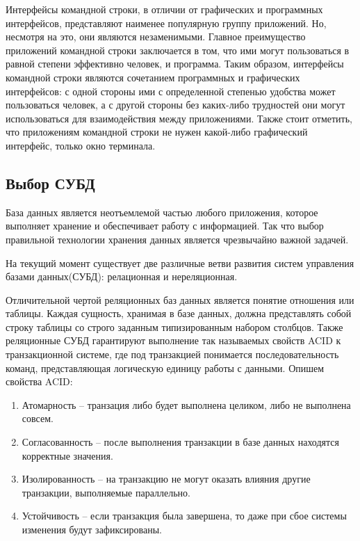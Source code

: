 Интерфейсы командной строки, в отличии от графических и программных интерфейсов, представляют
наименее популярную группу приложений. Но, несмотря на это, они являются
незаменимыми. Главное преимущество приложений командной строки заключается в том, что
ими могут пользоваться в равной степени эффективно человек, и программа. Таким образом,
интерфейсы командной строки являются сочетанием программных и графических интерфейсов:
с одной стороны ими с определенной степенью удобства может пользоваться человек, а с другой
стороны без каких-либо трудностей они могут использоваться для взаимодействия между
приложениями. Также стоит отметить, что приложениям командной строки не нужен какой-либо
графический интерфейс, только окно терминала.

\subsection*{Выбор СУБД}

База данных является неотъемлемой частью любого приложения, которое выполняет
хранение и обеспечивает работу с информацией. Так что выбор правильной технологии
хранения данных является чрезвычайно важной задачей. 

На текущий момент существует две различные ветви развития систем управления
базами данных(СУБД)\cite{GettingStartedWithNoSQL}: релационная и нереляционная.

Отличительной чертой реляционных баз данных является понятие отношения или таблицы.
Каждая сущность, хранимая в базе данных, должна представлять собой строку таблицы со 
строго заданным типизированным набором столбцов. Также реляционные СУБД гарантируют
выполнение так называемых свойств ACID к транзакционной системе, где под транзакцией
понимается последовательность команд, представляющая логическую единицу работы с данными.
Опишем свойства ACID: 

\begin{enumerate}
	\item Атомарность -- транзация либо будет выполнена целиком, либо
	      не выполнена совсем.
	\item Согласованность -- после выполнения транзакции в базе данных
	      находятся корректные значения.
	\item Изолированность -- на транзакцию не могут оказать влияния другие транзакции,
	      выполняемые параллельно.
	\item Устойчивость -- если транзакция была завершена, то даже при сбое системы
	      изменения будут зафиксированы.
\end{enumerate}

